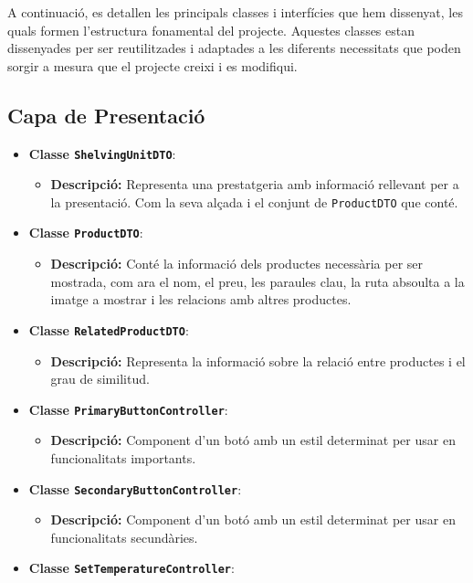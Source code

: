 \documentclass[a4paper,12pt]{report}
\begin{document}
A continuació, es detallen les principals classes i interfícies que hem dissenyat, les quals formen l'estructura fonamental del projecte. Aquestes classes estan dissenyades per ser reutilitzades i adaptades a les diferents necessitats que poden sorgir a mesura que el projecte creixi i es modifiqui. \\

\subsection{Capa de Presentació}
\begin{itemize}
	\item \textbf{Classe \texttt{ShelvingUnitDTO}}:
	\begin{itemize}
		\item \textbf{Descripció:} Representa una prestatgeria amb informació rellevant per a la presentació. Com la seva alçada i el conjunt de \texttt{ProductDTO} que conté.
	\end{itemize}
	\item \textbf{Classe \texttt{ProductDTO}}:
	\begin{itemize}
		\item \textbf{Descripció:} Conté la informació dels productes necessària per ser mostrada, com ara el nom, el preu, les paraules clau, la ruta absoulta a la imatge a mostrar i les relacions amb altres productes.
	\end{itemize}
	\item \textbf{Classe \texttt{RelatedProductDTO}}:
	\begin{itemize}
		\item \textbf{Descripció:} Representa la informació sobre la relació entre productes i el grau de similitud.
	\end{itemize}
	\item \textbf{Classe \texttt{PrimaryButtonController}}:
	\begin{itemize}
		\item \textbf{Descripció:} Component d'un botó amb un estil determinat per usar en funcionalitats importants.
	\end{itemize}
	\item \textbf{Classe \texttt{SecondaryButtonController}}:
	\begin{itemize}
		\item \textbf{Descripció:} Component d'un botó amb un estil determinat per usar en funcionalitats secundàries.
	\end{itemize}
	\item \textbf{Classe \texttt{SetTemperatureController}}:

\end{itemize}
\end{document}

